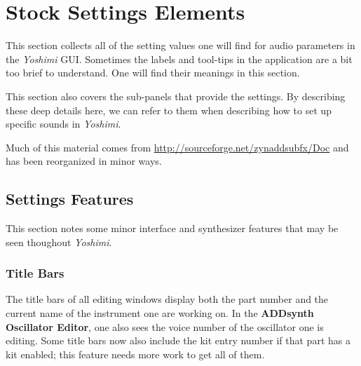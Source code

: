 %
%
%

\section{Stock Settings Elements}
\label{sec:stock_settings_elements}

   This section collects all of the setting values one will find for
   audio parameters in the \textsl{Yoshimi} GUI.
   Sometimes the labels and tool-tips
   in the application are a bit too brief to understand. 
   One will find their meanings in this section.

   This section also covers the sub-panels that provide the settings.
   By describing these deep details here, we can refer to them when
   describing how to set up specific sounds in
   \textsl{Yoshimi}.

   Much of this material comes from
   \url{http://sourceforge.net/zynaddsubfx/Doc}
   and has been reorganized in minor ways.

\subsection{Settings Features}
\label{sec:stock_settings_ui_features}

   This section notes some minor interface and synthesizer features that may
   be seen thoughout \textsl{Yoshimi}.

\subsubsection{Title Bars}
\label{subsubsec:stock_settings_elements_title_bars}

   The title bars of all editing windows display both the part number and the
   current name of the instrument one are working on.  In the
   \textbf{ADDsynth Oscillator Editor}, one also sees the
   voice number of the oscillator one is editing.  Some title bars now also
   include the kit entry number if that part has a kit enabled; this feature
   needs more work to get all of them.

